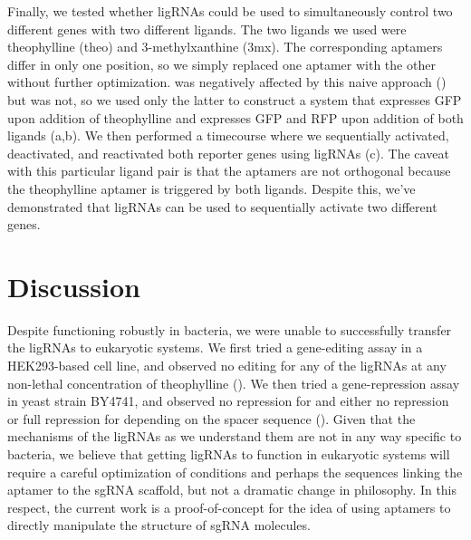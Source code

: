 \documentclass[10pt,oneside]{article}
\begin{document}
Finally, we tested whether ligRNAs could be used to simultaneously control two different genes with two different ligands.  The two ligands we used were theophylline (theo) and 3-methylxanthine (3mx).  The corresponding aptamers differ in only one position, so we simply replaced one aptamer with the other without further optimization.  \ligrnaF was negatively affected by this naive approach () but \ligrnaB was not, so we used only the latter to construct a system that expresses GFP upon addition of theophylline and expresses GFP and RFP upon addition of both ligands (a,b).  We then performed a timecourse where we sequentially activated, deactivated, and reactivated both reporter genes using ligRNAs (c).  The caveat with this particular ligand pair is that the aptamers are not orthogonal because the theophylline aptamer is triggered by both ligands.  Despite this, we've demonstrated that ligRNAs can be used to sequentially activate two different genes.


\section{Discussion}



Despite functioning robustly in bacteria, we were unable to successfully transfer the ligRNAs to eukaryotic systems.  We first tried a gene-editing assay in a HEK293-based cell line, and observed no editing for any of the ligRNAs at any non-lethal concentration of theophylline ().  We then tried a gene-repression assay in yeast strain BY4741, and observed no repression for \ligrnaF{} and either no repression or full repression for \ligrnaB{} depending on the spacer sequence ().  Given that the mechanisms of the ligRNAs as we understand them are not in any way specific to bacteria, we believe that getting ligRNAs to function in eukaryotic systems will require a careful optimization of conditions and perhaps the sequences linking the aptamer to the sgRNA scaffold, but not a dramatic change in philosophy.  In this respect, the current work is a proof-of-concept for the idea of using aptamers to directly manipulate the structure of sgRNA molecules.
\end{document}
